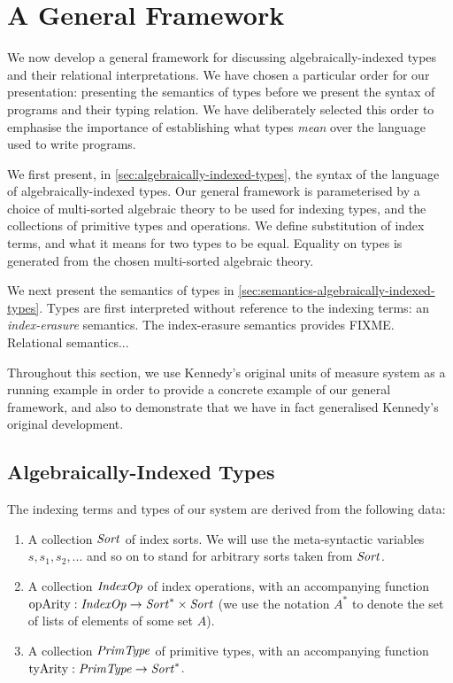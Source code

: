 \section{A General Framework}
\label{sec:a-general-framework}

We now develop a general framework for discussing
algebraically-indexed types and their relational interpretations. We
have chosen a particular order for our presentation: presenting the
semantics of types before we present the syntax of programs and their
typing relation. We have deliberately selected this order to emphasise
the importance of establishing what types \emph{mean} over the
language used to write programs.

We first present, in \autoref{sec:algebraically-indexed-types}, the
syntax of the language of algebraically-indexed types. Our general
framework is parameterised by a choice of multi-sorted algebraic
theory to be used for indexing types, and the collections of primitive
types and
operations. %
We define substitution of index terms, and what it means for two types
to be equal. Equality on types is generated from the chosen
multi-sorted algebraic theory.

We next present the semantics of types in
\autoref{sec:semantics-algebraically-indexed-types}. Types are first
interpreted without reference to the indexing terms: an
\emph{index-erasure} semantics. The index-erasure semantics provides
FIXME. Relational semantics...

Throughout this section, we use Kennedy's original units of measure
system as a running example in order to provide a concrete example of
our general framework, and also to demonstrate that we have in fact
generalised Kennedy's original development.

\subsection{Algebraically-Indexed Types}
\label{sec:algebraically-indexed-types}

The indexing terms and types of our system are derived from the
following data:
\begin{enumerate}
\item A collection $\mathit{Sort}$ of index sorts. We will use the
  meta-syntactic variables $s,s_1,s_2,...$ and so on to stand for
  arbitrary sorts taken from $\mathit{Sort}$.
\item A collection $\mathit{IndexOp}$ of index operations, with an
  accompanying function $\mathrm{opArity} : \mathit{IndexOp} \to \mathit{Sort}^*
  \times \mathit{Sort}$ (we use the notation $A^*$ to denote the set of
  lists of elements of some set $A$). 
\item A collection $\mathit{PrimType}$ of primitive types, with an
  accompanying function $\mathrm{tyArity} : \mathit{PrimType} \to
  \mathit{Sort}^*$.
\end{enumerate}

